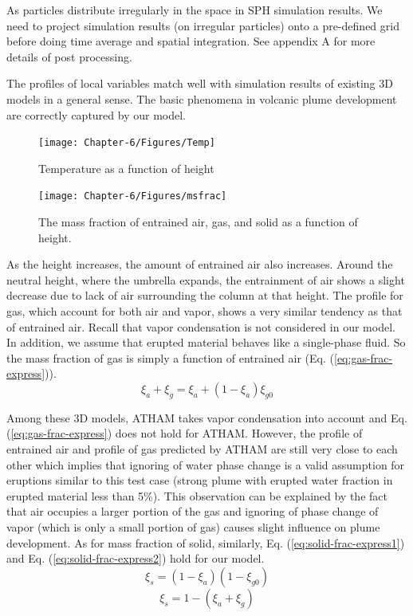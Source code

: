 As particles distribute irregularly in the space in SPH simulation results. We need to project simulation results (on irregular particles) onto a pre-defined grid before doing time average and spatial integration. See appendix A for more details of post processing.

The profiles of local variables match well with simulation results of existing 3D models in a general sense. The basic phenomena in volcanic plume development are correctly captured by our model.

\begin{figure}
\center
\texttt{[image: Chapter-6/Figures/Temp]}
\caption{Temperature as a function of height}
\label{fig:strong_local_temp}
\end{figure}

\begin{figure}
\texttt{[image: Chapter-6/Figures/msfrac]}
\caption{The mass fraction of entrained air, gas, and solid as a function of height.}
\label{fig:strong_plume_mass_fraction}
\end{figure}

As the height increases, the amount of entrained air also increases. Around the neutral height, where the umbrella expands, the entrainment of air shows a slight decrease due to lack of air surrounding the column at that height. The profile for gas, which account for both air and vapor, shows a very similar tendency as that of entrained air. Recall that vapor condensation is not considered in our model. In addition, we assume that erupted material behaves like a single-phase fluid. So the mass fraction of gas is simply a function of entrained air (Eq. (\ref{eq:gas-frac-express})).
\begin{equation}
\xi_a + \xi_g = \xi_a + \left(1-\xi_a\right) \xi_{g0}
\label{eq:gas-frac-express}
\end{equation}
 
Among these 3D models, ATHAM takes vapor condensation into account and Eq. (\ref{eq:gas-frac-express}) does not hold for ATHAM. However, the profile of entrained air and profile of gas predicted by ATHAM are still very close to each other which implies that ignoring of water phase change is a valid assumption for eruptions similar to this test case (strong plume with erupted water fraction in erupted material less than 5\%). This observation can be explained by the fact that air occupies a larger portion of the gas and ignoring of phase change of vapor (which is only a small portion of gas) causes slight influence on plume development. As for mass fraction of solid, similarly, Eq. (\ref{eq:solid-frac-express1}) and Eq. (\ref{eq:solid-frac-express2}) hold for our model. 
\begin{equation}
\xi_s = \left(1 - \xi_a\right) \left(1- \xi_{g0}\right)
\label{eq:solid-frac-express1}
\end{equation}
\begin{equation}
\xi_s = 1 - \left(\xi_a + \xi_g\right)
\label{eq:solid-frac-express2}
\end{equation}

